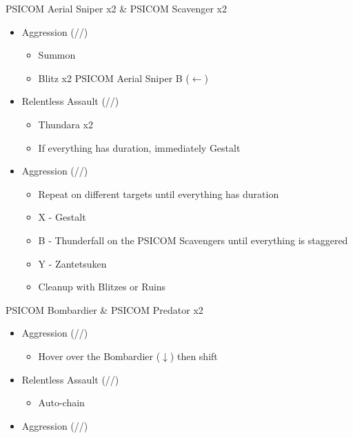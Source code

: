 \begin{multicols}{2}
\renewcommand{\first}{[1] Aggression (\com/\com/\rav)}
\renewcommand{\second}{[2] Relentless Assault (\rav/\com/\rav)}
\begin{battle}{PSICOM Aerial Sniper x2 \& PSICOM Scavenger x2}
\begin{itemize}
    \item \first
    \begin{itemize}
        \item Summon
        \item Blitz x2 PSICOM Aerial Sniper B ($\leftarrow$)
    \end{itemize}
    \item \second
    \begin{itemize}
        \item Thundara x2
        \item If everything has duration, immediately Gestalt
    \end{itemize}
    \item \first
    \begin{itemize}
        \item Repeat on different targets until everything has duration
        \item X - Gestalt
        \item B - Thunderfall on the PSICOM Scavengers until everything is staggered
        \item Y - Zantetsuken
        \item Cleanup with Blitzes or Ruins
    \end{itemize}
\end{itemize}
 
\end{battle}
\begin{battle}{PSICOM Bombardier \& PSICOM Predator x2}
\begin{itemize}
    \item \first
    \begin{itemize}
        \item Hover over the Bombardier ($\downarrow$) then shift
    \end{itemize}
    \item \second
    \begin{itemize}
        \item Auto-chain
    \end{itemize}
    \item \first

\end{itemize}
\end{battle}
\end{multicols}
